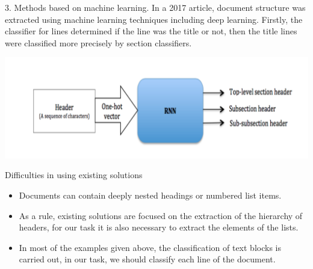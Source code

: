 \documentclass{beamer}
\begin{document}
\begin{frame}{3. Methods based on machine learning.}
        In a 2017 article, document structure was extracted using machine learning techniques including deep learning. Firstly, the classifier for lines determined if the line was the title or not, then the title lines were classified more precisely by section classifiers.
        
        \includegraphics[width=\textwidth]{pics/classifier.png}
\end{frame}

\begin{frame}{Difficulties in using existing solutions}
\begin{itemize}
    \item Documents can contain deeply nested headings or numbered list items.
    \item As a rule, existing solutions are focused on the extraction of the hierarchy of headers, for our task it is also necessary to extract the elements of the lists.
    \item In most of the examples given above, the classification of text blocks is carried out, in our task, we should classify each line of the document.
\end{itemize}
\end{frame}
\end{document}

